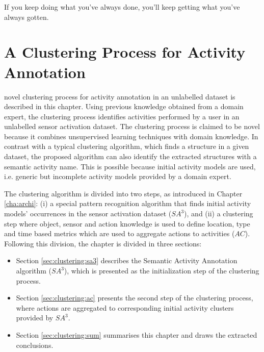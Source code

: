 

\begin{savequote}[50mm]
If you keep doing what you've always done, you'll keep getting what you've always gotten.
\end{savequote}


\chapter{A Clustering Process for Activity Annotation}
\label{cha:clustering}

\ifpdf
    \graphicspath{{4_clustering_process/figures/PDF/}{4_clustering_process/figures/PNG/}{4_clustering_process/figures/}}
\else
    \graphicspath{{4_clustering_process/figures/EPS/}{4_clustering_process/figures/}}
\fi

 novel clustering process for activity annotation in an unlabelled dataset is described in this chapter. Using previous knowledge obtained from a domain expert, the clustering process identifies activities performed by a user in an unlabelled sensor activation dataset. The clustering process is claimed to be novel because it combines unsupervised learning techniques with domain knowledge. In contrast with a typical clustering algorithm, which finds a structure in a given dataset, the proposed algorithm can also identify the extracted structures with a semantic activity name. This is possible because initial activity models are used, i.e. generic but incomplete activity models provided by a domain expert. 

The clustering algorithm is divided into two steps, as introduced in Chapter \ref{cha:archi}: (i) a special pattern recognition algorithm that finds initial activity models' occurrences in the sensor activation dataset ($SA^3$), and (ii) a clustering step where object, sensor and action knowledge is used to define location, type and time based metrics which are used to aggregate actions to activities ($AC$). Following this division, the chapter is divided in three sections:

\begin{itemize}
 \item Section \ref{sec:clustering:sa3} describes the Semantic Activity Annotation algorithm ($SA^3$), which is presented as the initialization step of the clustering process.
 \item Section \ref{sec:clustering:ac} presents the second step of the clustering process, where actions are aggregated to corresponding initial activity clusters provided by $SA^3$.
 \item Section \ref{sec:clustering:sum} summarises this chapter and draws the extracted conclusions.
\end{itemize}
